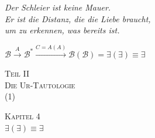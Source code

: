 \documentclass[10pt, openany, oneside]{book}
\renewcommand{\normalsize}{\fontsize{10}{13}\selectfont}
\renewcommand{\large}{\fontsize{11.5}{14}\selectfont}
\renewcommand{\LARGE}{\fontsize{15}{18}\selectfont}
\renewcommand{\huge}{\fontsize{17}{21}\selectfont}
\begin{document}
\vspace{0.5em}

\begin{center}
    \itshape
    Der Schleier ist keine Mauer.\\
    Er ist die Distanz, die die Liebe braucht,\\
    um zu erkennen, was bereits ist.
\end{center}

\vspace{0.5em}

\begin{center}
    $\mathcal{B} \xrightarrow{A} \mathcal{B}^* \xrightarrow{C = A(A)} \mathcal{B}(\mathcal{B}) = \exists(\exists) \equiv \exists$
\end{center}

%
%
%
%

%
%

\newpage
\thispagestyle{empty}
\vspace*{\fill}
\begin{center}
    {\LARGE\scshape Teil II}\\[1em]
    {\large\scshape Die Ur-Tautologie}\\[0.5em]
    {\normalsize (1)}
\end{center}
\vspace*{\fill}
\newpage


\newpage

\begin{center}
    {\huge\scshape Kapitel 4}\\[0.3em]
    {\large $\exists(\exists) \equiv \exists$}
\end{center}
\end{document}
